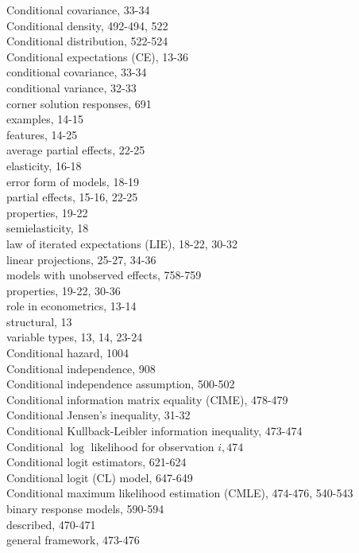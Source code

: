 \documentclass[10pt]{article}
\begin{document}
Conditional covariance, 33-34\\
Conditional density, 492-494, 522\\
Conditional distribution, 522-524\\
Conditional expectations (CE), 13-36\\
conditional covariance, 33-34\\
conditional variance, 32-33\\
corner solution responses, 691\\
examples, 14-15\\
features, 14-25\\
average partial effects, 22-25\\
elasticity, 16-18\\
error form of models, 18-19\\
partial effects, 15-16, 22-25\\
properties, 19-22\\
semielasticity, 18\\
law of iterated expectations (LIE), 18-22, 30-32\\
linear projections, 25-27, 34-36\\
models with unobserved effects, 758-759\\
properties, 19-22, 30-36\\
role in econometrics, 13-14\\
structural, 13\\
variable types, 13, 14, 23-24\\
Conditional hazard, 1004\\
Conditional independence, 908\\
Conditional independence assumption, 500-502\\
Conditional information matrix equality (CIME), 478-479\\
Conditional Jensen's inequality, 31-32\\
Conditional Kullback-Leibler information inequality, 473-474\\
Conditional $\log$ likelihood for observation $i, 474$\\
Conditional logit estimators, 621-624\\
Conditional logit (CL) model, 647-649\\
Conditional maximum likelihood estimation (CMLE), 474-476, 540-543\\
binary response models, 590-594\\
described, 470-471\\
general framework, 473-476\\
\end{document}

